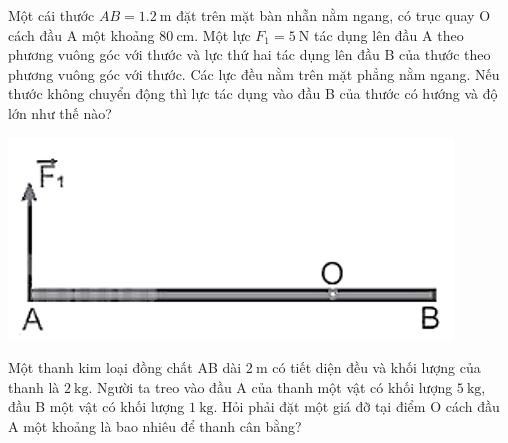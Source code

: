 \begin{ex}
	Một cái thước $AB=\SI{1.2}{\meter}$ đặt trên mặt bàn nhẵn nằm ngang, có trục quay O cách đầu A một khoảng $\SI{80}{\centi\meter}$. Một lực $F_1=\SI{5}{\newton}$ tác dụng lên đầu A theo phương vuông góc với thước và lực thứ hai tác dụng lên đầu B của thước theo phương vuông góc với thước. Các lực đều nằm trên mặt phẳng nằm ngang. Nếu thước không chuyển động thì lực tác dụng vào đầu B của thước có hướng và độ lớn như thế nào?
		\begin{center}
		\includegraphics[width=0.35\linewidth]{../figs/VN10-2022-PH-TP023-P-8}
	\end{center}
\end{ex}
\begin{ex}
	Một thanh kim loại đồng chất AB dài $\SI{2}{\meter}$ có tiết diện đều và khối lượng của thanh là $\SI{2}{\kilo\gram}$. Người ta treo vào đầu A của thanh một vật có khối lượng $\SI{5}{\kilogram}$, đầu B một vật có khối lượng $\SI{1}{\kilogram}$. Hỏi phải đặt một giá đỡ tại điểm O cách đầu A một khoảng là bao nhiêu để thanh cân bằng?
\end{ex}

